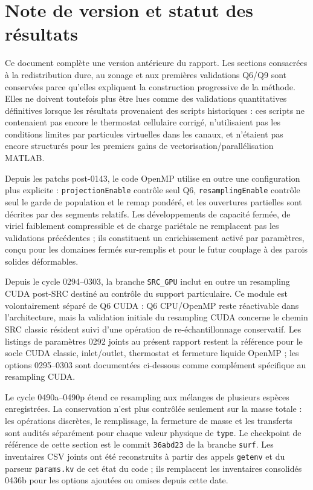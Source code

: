 \documentclass[11pt,a4paper]{article}
\begin{document}
\tableofcontents


\section*{Note de version et statut des résultats}

Ce document complète une version antérieure du rapport. Les sections consacrées à la redistribution dure, au zonage et aux premières validations Q6/Q9 sont conservées parce qu'elles expliquent la construction progressive de la méthode. Elles ne doivent toutefois plus être lues comme des validations quantitatives définitives lorsque les résultats provenaient des scripts historiques : ces scripts ne contenaient pas encore le thermostat cellulaire corrigé, n'utilisaient pas les conditions limites par particules virtuelles dans les canaux, et n'étaient pas encore structurés pour les premiers gains de vectorisation/parallélisation MATLAB.



Depuis les patchs post-0143, le code OpenMP utilise en outre une configuration plus explicite : \texttt{projectionEnable} contrôle seul Q6, \texttt{resamplingEnable} contrôle seul le garde de population et le remap pondéré, et les ouvertures partielles sont décrites par des segments relatifs. Les développements de capacité fermée, de viriel faiblement compressible et de charge pariétale ne remplacent pas les validations précédentes ; ils constituent un enrichissement activé par paramètres, conçu pour les domaines fermés sur-remplis et pour le futur couplage à des parois solides déformables.


Depuis le cycle 0294--0303, la branche \texttt{SRC\_GPU} inclut en outre un resampling CUDA post-SRC destiné au contrôle du support particulaire. Ce module est volontairement séparé de Q6 CUDA : Q6 CPU/OpenMP reste réactivable dans l'architecture, mais la validation initiale du resampling CUDA concerne le chemin SRC classic résident suivi d'une opération de re-échantillonnage conservatif. Les listings de paramètres 0292 joints au présent rapport restent la référence pour le socle CUDA classic, inlet/outlet, thermostat et fermeture liquide OpenMP ; les options 0295--0303 sont documentées ci-dessous comme complément spécifique au resampling CUDA.


Le cycle 0490a--0490p étend ce resampling aux mélanges de plusieurs espèces enregistrées. La conservation n'est plus contrôlée seulement sur la masse totale : les opérations discrètes, le remplissage, la fermeture de masse et les transferts sont audités séparément pour chaque valeur physique de \texttt{type}. Le checkpoint de référence de cette section est le commit \texttt{36abd23} de la branche \texttt{surf}. Les inventaires CSV joints ont été reconstruits à partir des appels \texttt{getenv} et du parseur \texttt{params.kv} de cet état du code ; ils remplacent les inventaires consolidés 0436b pour les options ajoutées ou omises depuis cette date.
\end{document}
